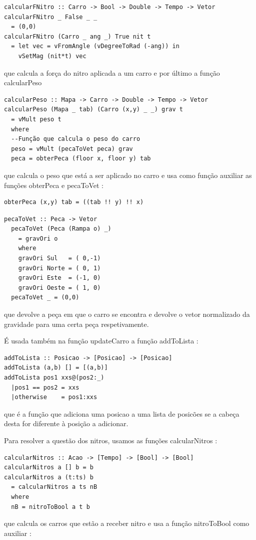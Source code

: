 \documentclass[a4paper]{report} %
\begin{document}
\begin{verbatim}
calcularFNitro :: Carro -> Bool -> Double -> Tempo -> Vetor
calcularFNitro _ False _ _
  = (0,0)
calcularFNitro (Carro _ ang _) True nit t
  = let vec = vFromAngle (vDegreeToRad (-ang)) in
    vSetMag (nit*t) vec
\end{verbatim}
que calcula a força do nitro aplicada a um carro e por último a função calcularPeso

\begin{verbatim}
calcularPeso :: Mapa -> Carro -> Double -> Tempo -> Vetor
calcularPeso (Mapa _ tab) (Carro (x,y) _ _) grav t
  = vMult peso t
  where
  --Função que calcula o peso do carro
  peso = vMult (pecaToVet peca) grav
  peca = obterPeca (floor x, floor y) tab
\end{verbatim}
que calcula o peso que está a ser aplicado no carro e usa como função auxiliar as funções obterPeca e pecaToVet :

\begin{verbatim}
obterPeca (x,y) tab = ((tab !! y) !! x)
\end{verbatim}

\begin{verbatim}
pecaToVet :: Peca -> Vetor 
  pecaToVet (Peca (Rampa o) _)
    = gravOri o
    where
    gravOri Sul   = ( 0,-1)
    gravOri Norte = ( 0, 1)
    gravOri Este  = (-1, 0)
    gravOri Oeste = ( 1, 0)
  pecaToVet _ = (0,0)
\end{verbatim}
que devolve a peça em que o carro se encontra e devolve o vetor normalizado da gravidade para uma certa peça respetivamente.

É usada também na função updateCarro a função addToLista : 

\begin{verbatim}
addToLista :: Posicao -> [Posicao] -> [Posicao]
addToLista (a,b) [] = [(a,b)]
addToLista pos1 xxs@(pos2:_)
  |pos1 == pos2 = xxs
  |otherwise    = pos1:xxs
\end{verbatim}
que é a função que adiciona uma posicao a uma lista de posicões se a cabeça desta for diferente
à posição a adicionar.


Para resolver a questão dos nitros, usamos as funções calcularNitros : 

\begin{verbatim}
calcularNitros :: Acao -> [Tempo] -> [Bool] -> [Bool]
calcularNitros a [] b = b
calcularNitros a (t:ts) b
  = calcularNitros a ts nB
  where
  nB = nitroToBool a t b
\end{verbatim}
que calcula os carros que estão a receber nitro e usa a função nitroToBool como auxiliar :
\end{document}
